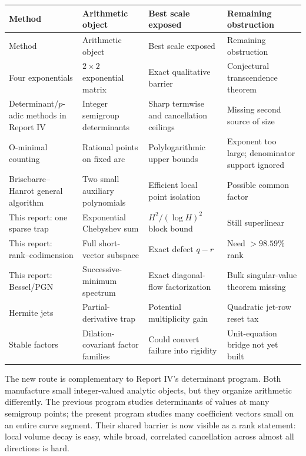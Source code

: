 \documentclass[11pt,oneside]{article}
\theoremstyle{definition}
\theoremstyle{remark}
\begin{document}
\begin{longtable}{@{}>{\raggedright\arraybackslash}p{}>{\raggedright\arraybackslash}p{}>{\raggedright\arraybackslash}p{}>{\raggedright\arraybackslash}p{}@{}}
\toprule
Method & Arithmetic object & Best scale exposed & Remaining obstruction \\
\midrule
\endfirsthead
\toprule
Method & Arithmetic object & Best scale exposed & Remaining obstruction \\
\midrule
\endhead
Four exponentials & $2\times2$ exponential matrix & Exact qualitative barrier & Conjectural transcendence theorem \\
Determinant/$p$-adic methods in Report IV & Integer semigroup determinants & Sharp termwise and cancellation ceilings & Missing second source of size \\
O-minimal counting & Rational points on fixed arc & Polylogarithmic upper bounds & Exponent too large; denominator support ignored \\
Brisebarre--Hanrot general algorithm & Two small auxiliary polynomials & Efficient local point isolation & Possible common factor \\
This report: one sparse trap & Exponential Chebyshev sum & $H^2/(\log H)^2$ block bound & Still superlinear \\
This report: rank--codimension & Full short-vector subspace & Exact defect $q-r$ & Need $>98.59\%$ rank \\
This report: Bessel/PGN & Successive-minimum spectrum & Exact diagonal-flow factorization & Bulk singular-value theorem missing \\
Hermite jets & Partial-derivative trap & Potential multiplicity gain & Quadratic jet-row reset tax \\
Stable factors & Dilation-covariant factor families & Could convert failure into rigidity & Unit-equation bridge not yet built \\
\bottomrule
\end{longtable}

The new route is complementary to Report IV's determinant program.  Both manufacture small
integer-valued analytic objects, but they organize arithmetic differently.  The previous
program studies determinants of values at many semigroup points; the present program studies
many coefficient vectors small on an entire curve segment.  Their shared barrier is now
visible as a rank statement: local volume decay is easy, while broad, correlated cancellation
across almost all directions is hard.
\end{document}
